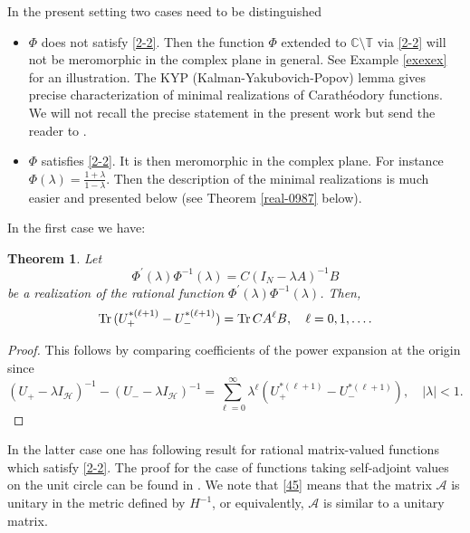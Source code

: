 \documentclass[12pt]{amsart}
\newtheorem{thm}{Theorem}[section]
\theoremstyle{definition}
\theoremstyle{remark}
\numberwithin{equation}{section}
\begin{document}
In the present setting two cases need to be distinguished
      \begin{itemize}
      \item $\Phi$ does not satisfy \eqref{2-2}. Then the function $\Phi$ extended to $\mathbb C\setminus\mathbb T$ via \eqref{2-2}
        will not be meromorphic in the complex plane in general. See Example \ref{exexex} for an illustration. The KYP (Kalman-Yakubovich-Popov) lemma
        gives precise characterization of minimal realizations of Carath\'eodory functions. We will not recall the precise statement in the present work but send the
        reader to \cite{MR525380,kyp4,kyp3,kyp2,Rantez,kyp1}.\\

      \item $\Phi$ satisfies \eqref{2-2}. It is then
        meromorphic in the complex plane.
        For instance $\Phi(\lambda)=\frac{1+{\lambda}}{1-{\lambda}}$.
        Then the description of the minimal realizations is much easier and presented below (see Theorem \ref{real-0987} below).
\end{itemize}


        In the first case we have:

                \begin{thm}
          Let
          \[
\Phi^\prime(\lambda)\Phi^{-1}(\lambda)=C(I_N-\lambda A)^{-1}B
\]
be a realization of the rational function $\Phi^\prime(\lambda)\Phi^{-1}(\lambda)$. Then,
\begin{equation}
\label{lala}
    {\rm Tr}\,( U_+^{*(\ell+1)}-U_-^{*(\ell+1)})={\rm Tr}\, CA^\ell B,\quad \ell=0,1,\ldots .
\end{equation}
          \end{thm}
          \begin{proof}
            This follows by comparing coefficients of the power expansion at the origin since
            \[
              (U_+-\lambda I_{\mathcal H})^{-1}-(U_--\lambda I_{\mathcal H})^{-1}=\sum_{\ell=0}^\infty
              \lambda^{\ell}(U_+^{*(\ell+1)}-U_-^{*(\ell+1)}), \quad |\lambda|<1.
\]
            \end{proof}


In the latter case one has following result for rational matrix-valued functions which satisfy \eqref{2-2}. The proof for the case of functions taking self-adjoint values on
the unit circle can be found in \cite[\S 5]{ag}. We note that
\eqref{45} means that the matrix $\mathscr A$ is unitary in the metric defined by $H^{-1}$, or equivalently, $\mathscr A$ is similar to a unitary matrix.
\end{document}
